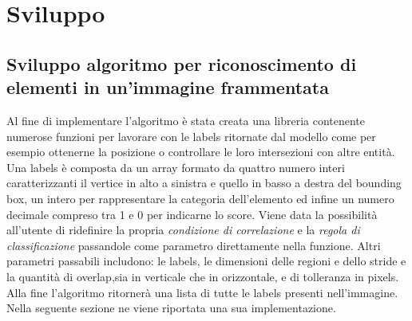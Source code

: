 \section{Sviluppo}
\subsection{Sviluppo algoritmo per riconoscimento di elementi in un'immagine frammentata}
Al fine di implementare l'algoritmo è stata creata una libreria contenente numerose funzioni per lavorare con le labels ritornate dal modello come per esempio ottenerne la posizione o controllare le loro intersezioni con altre entità. Una labels è composta da un array formato da quattro numero interi caratterizzanti il vertice in alto a sinistra e quello in basso a destra del bounding box, un intero per rappresentare la categoria dell'elemento ed infine un numero decimale compreso tra 1 e 0 per indicarne lo score.
Viene data la possibilità all'utente di ridefinire la propria \textit{condizione di correlazione} e la \textit{regola di classificazione} passandole come parametro direttamente nella funzione. Altri parametri passabili includono: le labels, le dimensioni delle regioni e dello stride e la quantità di overlap,sia in verticale che in orizzontale, e di tolleranza in pixels.
Alla fine l'algoritmo ritornerà una lista di tutte le labels presenti nell'immagine.\\ Nella seguente sezione ne viene riportata una sua implementazione.
